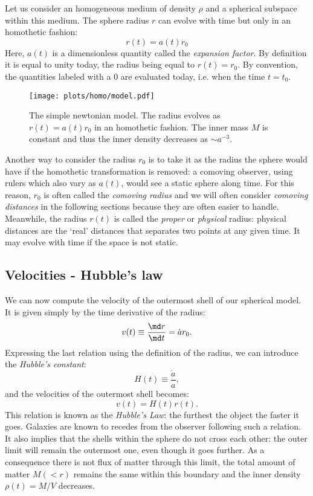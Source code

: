 Let us consider an homogeneous medium of density $\rho$ and a spherical subspace within this medium. The sphere radius $r$ can evolve with time but only in an homothetic fashion:
\begin{equation}
	r(t)=a(t)r_0
\end{equation} 
Here, $a(t)$ is a dimensionless quantity called the \emph{expansion factor}. By definition it is equal to unity today, the radius being equal to $r(t)=r_0$. By convention, the quantities labeled with a $0$ are evaluated today, i.e. when the time $t=t_0$.
\begin{figure}[htbp]
	\centering
		\texttt{[image: plots/homo/model.pdf]}
	\caption{The simple newtonian model. The radius evolves as $r(t)=a(t)r_0$ in an homothetic fashion. The inner mass $M$ is constant and thus the inner density decreases as $\sim a^{-3}$.}
	\label{fig:plots_homo_model}
\end{figure}

Another way to consider the radius $r_0$ is to take it as the radius the sphere would have if the homothetic transformation is removed: a comoving observer, using rulers which also vary as $a(t)$, would see a static sphere along time. For this reason, $r_0$ is often called the \emph{comoving radius} and we will often consider \emph{comoving distances} in the following sections because they are often easier to handle. Meanwhile, the radius $r(t)$ is called the \emph{proper} or \emph{physical} radius: physical distances are the `real' distances that separates two points at any given time. It may evolve with time if the space is not static.  

\subsection{Velocities - Hubble's law} %
\label{sub:velocities_hubble_s_law}
We can now compute the velocity of the outermost shell of our spherical model. It is given simply by the time derivative of the radius:
\begin{equation}
	v(t)\equiv\frac{\md r}{\md t}=\dot a r_0.
\end{equation}
Expressing the last relation using the definition of the radius, we can introduce the \emph{Hubble's constant}:
\begin{equation}
	H(t)\equiv\frac{\dot a}{a},
\end{equation}
and the velocities of the outermost shell becomes:
\begin{equation}
	v(t)=H(t)r(t).
\end{equation}
This relation is known as the \emph{Hubble's Law}: the furthest the object the faster it goes. Galaxies are known to recedes from the observer following such a relation. It also implies that the shells within the sphere do not cross each other: the outer limit will remain the outermost one, even though it goes further. As a consequence there is not flux of matter through this limit, the total amount of matter $M(<r)$ remains the same within this boundary and the inner density $\rho(t)=M/V$ decreases.

